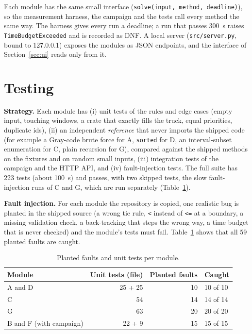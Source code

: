 \documentclass[11pt,a4paper]{article}
\newcommand{\cs}[1]{\texttt{#1}}
\begin{document}
Each module has the same small interface (\cs{solve(input, method, deadline)}), so the measurement harness, the campaign and the tests call every method the same way. The harness gives every run a deadline; a run that passes 300~s raises
\cs{TimeBudgetExceeded} and is recorded as DNF. A local server (\cs{src/server.py}, bound to 127.0.0.1) exposes the modules as JSON endpoints, and the interface of Section~\ref{sec:ui} reads only from it.

\section{Testing}\label{sec:tests}
\textbf{Strategy.} Each module has (i) unit tests of the rules and edge cases (empty input, touching windows, a crate that exactly fills the truck, equal priorities, duplicate ids), (ii) an independent \emph{reference} that never imports the shipped code
(for example a Gray-code brute force for A, \cs{sorted} for D, an interval-subset enumeration for C, plain recursion for G), compared against the shipped methods on the fixtures and on random small inputs, (iii) integration tests of the campaign and the HTTP API,
and (iv) fault-injection tests. The full suite has 223 tests (about 100~s) and passes, with two skipped tests, the slow fault-injection runs of C and G, which are run separately (Table~\ref{tab:fault}).

\textbf{Fault injection.} For each module the repository is copied, one realistic bug is planted in the shipped source (a wrong tie rule, \texttt{<} instead of \texttt{<=} at a boundary, a missing validation check, a back-tracking that steps the wrong way,
a time budget that is never checked) and the module's tests must fail. Table~\ref{tab:fault} shows that all 59 planted faults are caught.

\begin{table}[t]
\centering\small
\caption{Planted faults and unit tests per module.}\label{tab:fault}
\begin{tabular}{@{}lrrl@{}}
\toprule
Module & Unit tests (file) & Planted faults & Caught\\
\midrule
A and D & 25 + 25 & 10 & 10 of 10\\
C & 54 & 14 & 14 of 14\\
G & 63 & 20 & 20 of 20\\
B and F (with campaign) & 22 + 9 & 15 & 15 of 15\\
\bottomrule
\end{tabular}
\end{table}
\end{document}
